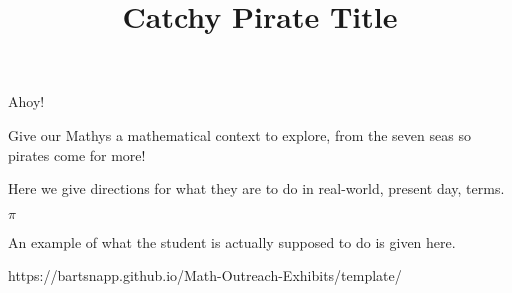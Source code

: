 \documentclass{../exhibit}
\title{Catchy Pirate Title}
\begin{document}
\begin{context}
  Ahoy!

  Give our Mathys a mathematical context to explore, from the seven
  seas  so pirates come for more!
\end{context}



\begin{directions}
  Here we give directions for what they are to do in real-world,
  present day, terms.

  $\pi$
\end{directions}



\begin{example}
  An example of what the student is actually supposed to do is given
  here.
\end{example}



\begin{mathConnections}
  https://bartsnapp.github.io/Math-Outreach-Exhibits/template/
\end{mathConnections}
\end{document}
